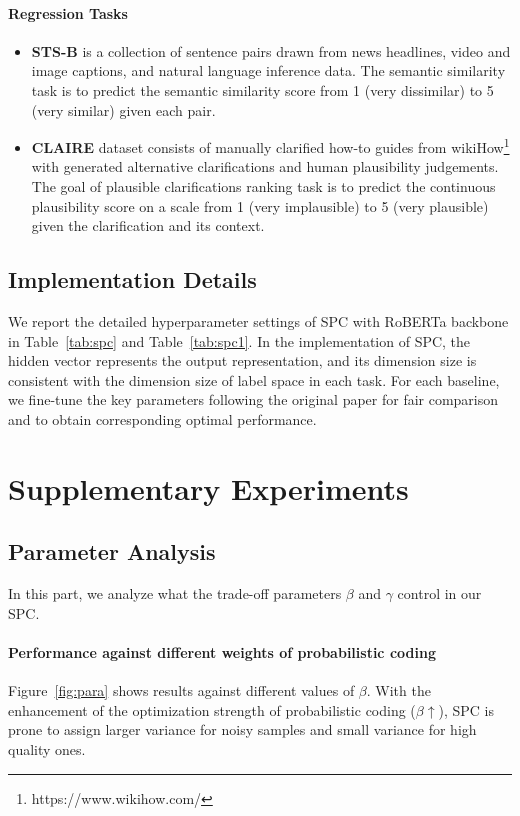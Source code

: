 \documentclass[letterpaper]{article} %
\begin{document}
\paragraph{Regression Tasks}
\begin{itemize}
    \item
    \textbf{STS-B} \cite{DBLP:conf/semeval/CerDALS17} is a collection of sentence pairs drawn from news headlines, video and image captions, and natural language inference data. The semantic similarity task is to predict the semantic similarity score from 1 (very dissimilar) to 5 (very similar) given each pair.
    \item   \textbf{CLAIRE} \cite{DBLP:conf/semeval/RothAS22}
     dataset consists of manually clarified how-to guides from wikiHow\footnote{https://www.wikihow.com/} with generated alternative clarifications and human plausibility judgements.
    The goal of plausible clarifications ranking task is to predict the continuous plausibility score on a scale from 1 (very implausible) to 5 (very plausible) given the clarification and its context.
\end{itemize}





\subsection{Implementation Details}
We report the detailed hyperparameter settings of SPC with RoBERTa backbone in Table~\ref{tab:spc} and Table~\ref{tab:spc1}.
In the implementation of SPC, the hidden vector represents the output representation, and its dimension size is consistent with the dimension size of label space in each task. For each baseline, we fine-tune the key parameters following the original paper for fair comparison and to obtain corresponding optimal performance.

\section{Supplementary Experiments}
\subsection{Parameter Analysis}
In this part, we analyze what the trade-off parameters $\beta$ and $\gamma$ control in our SPC.


\paragraph{Performance against different weights of probabilistic coding}
Figure~\ref{fig:para} shows results against different values of $\beta$. With the enhancement of the optimization strength of probabilistic coding ($\beta \uparrow$), SPC is prone to assign larger variance for noisy samples and small variance for high quality ones.
\end{document}
